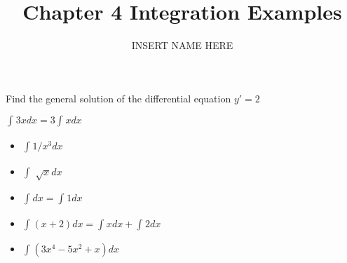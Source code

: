 \documentclass{article}
\title{Chapter 4 Integration Examples}
\author{INSERT NAME HERE}
\theoremstyle{mytheoremstyle}
\theoremstyle{mytheoremstyle}
\theoremstyle{myproblemstyle}
\begin{document}
    \maketitle

    \setcounter{section}{4}
    
    \begin{problem}
        Find the general solution of the differential equation $ y' = 2 $
    \end{problem}
    
    \begin{problem}
        $ \int_{}^{} 3x dx = 3 \int_{}^{} xdx $ 
    \end{problem}

    \begin{problem}

        \begin{itemize}
            \item $ \int_{}^{} 1/x^{3} dx $
            \item $ \int_{}^{} \sqrt[]{x} dx $
        \end{itemize} 
    \end{problem}
    
    \begin{problem}
        \begin{itemize}
            \item $ \int_{}^{} dx  = \int_{}^{} 1 dx $
            \item $ \int_{}^{} (x+2) dx  = \int_{}^{} x dx + \int_{}^{} 2 dx $
            \item $ \int_{}^{} (3x^4 - 5x^2 + x) dx $ 
        \end{itemize}
    \end{problem}

    \begin{problem}
        
    \end{problem}

    \begin{problem}
        
    \end{problem}

    \begin{problem}
        
    \end{problem}

    \begin{problem}
        
    \end{problem}

    \begin{problem}
        
    \end{problem}
\end{document}
